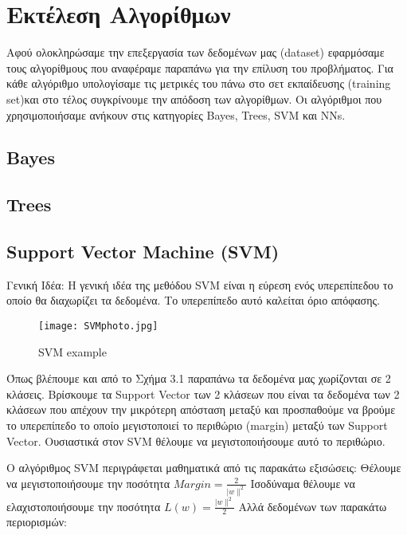 
\chapter{Εκτέλεση Αλγορίθμων}

Αφού ολοκληρώσαμε την επεξεργασία των δεδομένων μας (dataset) εφαρμόσαμε τους αλγορίθμους που αναφέραμε παραπάνω για την επίλυση του προβλήματος. Για κάθε αλγόριθμο υπολογίσαμε τις μετρικές του πάνω στο σετ εκπαίδευσης (training set)και στο τέλος συγκρίνουμε την απόδοση των αλγορίθμων. Οι αλγόριθμοι που χρησιμοποιήσαμε ανήκουν στις κατηγορίες Bayes, Trees, SVM και NNs.

\section{Bayes}

\section{Trees}


\section{Support Vector Machine (SVM)}

Γενική Ιδέα: H γενική ιδέα της μεθόδου SVM είναι η εύρεση ενός υπερεπίπεδου το οποίο θα διαχωρίζει τα δεδομένα. Το υπερεπίπεδο αυτό καλείται όριο απόφασης. 

\begin{figure}[h!]
	\texttt{[image: SVMphoto.jpg]}
	\caption {SVM example}
	\label{fig:SVM}  
\end{figure}

Όπως βλέπουμε και από το Σχήμα 3.1 παραπάνω τα δεδομένα μας χωρίζονται σε 2 κλάσεις. Βρίσκουμε τα Support Vector των 2 κλάσεων που είναι τα δεδομένα των 2 κλάσεων που απέχουν την μικρότερη απόσταση μεταξύ και προσπαθούμε να βρούμε το υπερεπίπεδο το οποίο μεγιστοποιεί το περιθώριο (margin) μεταξύ των Support Vector. Ουσιαστικά στον SVM θέλουμε να μεγιστοποιήσουμε αυτό το περιθώριο.


Ο αλγόριθμος SVM περιγράφεται μαθηματικά από τις παρακάτω εξισώσεις:
\newline
Θέλουμε να μεγιστοποιήσουμε την ποσότητα   $ Margin=\frac{2}{|w\|^2} $
\newline
Ισοδύναμα θέλουμε να ελαχιστοποιήσουμε την ποσότητα  $ L(w)=\frac{|w\|^2}{2} $
\newline
	Αλλά δεδομένων των παρακάτω περιορισμών:


